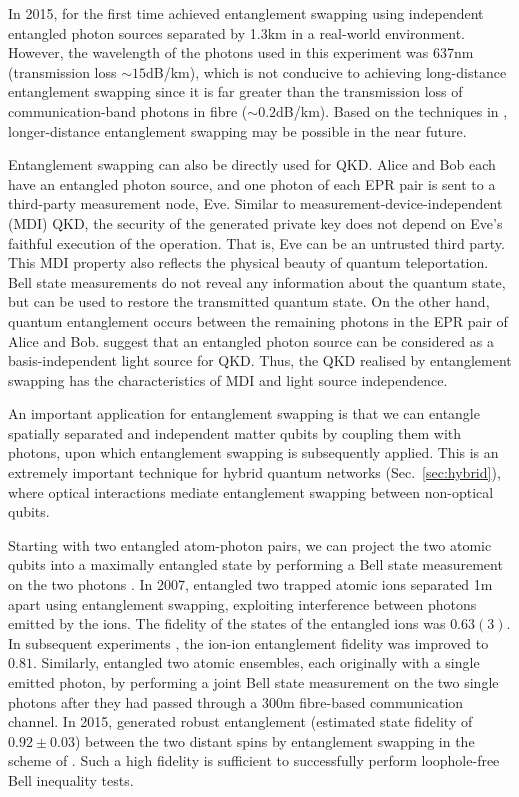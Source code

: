 \documentclass[aps, rmp, twocolumn, amsmath, amssymb, nofootinbib, superscriptaddress, longbibliography, floatfix, table-of-contents, eqsecnum]{revtex4-1}
\begin{document}
In 2015, \cite{bib:Nat_526_682} for the first time achieved entanglement swapping using independent entangled photon sources separated by 1.3km in a real-world environment. However, the wavelength of the photons used in this experiment was 637nm (transmission loss \mbox{$\sim 15$dB/km}), which is not conducive to achieving long-distance entanglement swapping since it is far greater than the transmission loss of communication-band photons in fibre (\mbox{$\sim 0.2$dB/km}). Based on the techniques in \cite{bib:Nat_phot_10_671, bib:Nat_phot_10_676}, longer-distance entanglement swapping may be possible in the near future.

Entanglement swapping can also be directly used for QKD. Alice and Bob each have an entangled photon source, and one photon of each EPR pair is sent to a third-party measurement node, Eve. Similar to measurement-device-independent (MDI) QKD, the security of the generated private key does not depend on Eve's faithful execution of the operation. That is, Eve can be an untrusted third party. This MDI property also reflects the physical beauty of quantum teleportation. Bell state measurements do not reveal any information about the quantum state, but can be used to restore the transmitted quantum state. On the other hand, quantum entanglement occurs between the remaining photons in the EPR pair of Alice and Bob. \cite{bib:PRL_90_057902, bib:NJP_10_2008} suggest that an entangled photon source can be considered as a basis-independent light source for QKD. Thus, the QKD realised by entanglement swapping has the characteristics of MDI and light source independence.

An important application for entanglement swapping is that we can entangle spatially separated and independent matter qubits by coupling them with photons, upon which entanglement swapping is subsequently applied. This is an extremely important technique for hybrid quantum networks (Sec.~\ref{sec:hybrid}), where optical interactions mediate entanglement swapping between non-optical qubits.

Starting with two entangled atom-photon pairs, we can project the two atomic qubits into a maximally entangled state by performing a Bell state measurement on the two photons \cite{bib:Nature_428_153, bib:PRL_96_030404}. In 2007, \cite{bib:Nature_449_68} entangled two trapped atomic ions separated 1m apart using entanglement swapping, exploiting interference between photons emitted by the ions. The fidelity of the states of the entangled ions was $0.63(3)$. In subsequent experiments \cite{bib:PRL_100_150404}, the ion-ion entanglement fidelity was improved to $0.81$. Similarly, \cite{bib:Nature_454_1098} entangled two atomic ensembles, each originally with a single emitted photon, by performing a joint Bell state measurement on the two single photons after they had passed through a 300m fibre-based communication channel. In 2015, \cite{bib:Nature_526_682} generated robust entanglement (estimated state fidelity of $0.92\pm0.03$) between the two distant spins by entanglement swapping in the scheme of \cite{bib:PRA_71_060310, bib:Nature_497_86}. Such a high fidelity is sufficient to successfully perform loophole-free Bell inequality tests.
\end{document}
